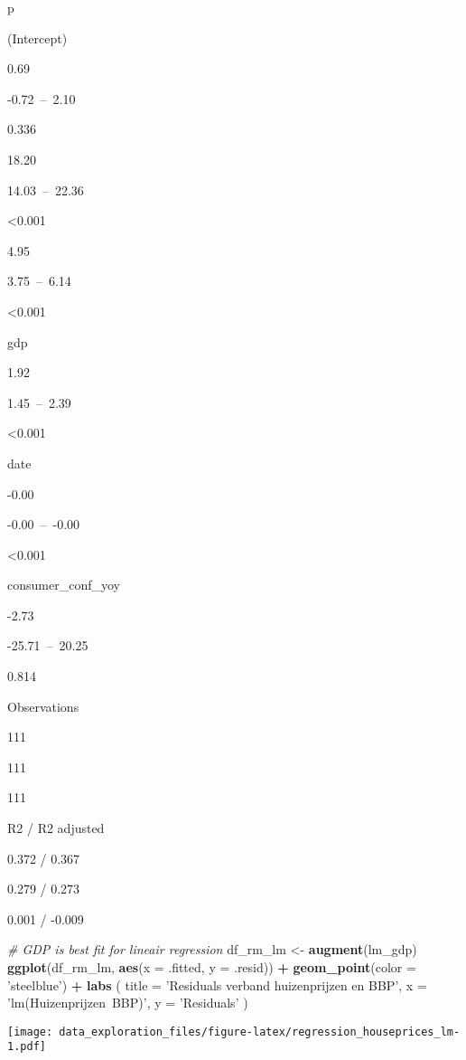 \documentclass[
]{article}
\newenvironment{Shaded}{\begin{snugshade}}{\end{snugshade}}
\newcommand{\CommentTok}[1]{\textcolor[rgb]{0.56,0.35,0.01}{\textit{#1}}}
\newcommand{\DataTypeTok}[1]{\textcolor[rgb]{0.13,0.29,0.53}{#1}}
\newcommand{\KeywordTok}[1]{\textcolor[rgb]{0.13,0.29,0.53}{\textbf{#1}}}
\newcommand{\NormalTok}[1]{#1}
\newcommand{\OperatorTok}[1]{\textcolor[rgb]{0.81,0.36,0.00}{\textbf{#1}}}
\newcommand{\StringTok}[1]{\textcolor[rgb]{0.31,0.60,0.02}{#1}}
\begin{document}
p

(Intercept)

0.69

-0.72~--~2.10

0.336

18.20

14.03~--~22.36

\textless0.001

4.95

3.75~--~6.14

\textless0.001

gdp

1.92

1.45~--~2.39

\textless0.001

date

-0.00

-0.00~--~-0.00

\textless0.001

consumer\_conf\_yoy

-2.73

-25.71~--~20.25

0.814

Observations

111

111

111

R2 / R2 adjusted

0.372 / 0.367

0.279 / 0.273

0.001 / -0.009

\begin{Shaded}
\begin{Highlighting}[]
\CommentTok{# GDP is best fit for lineair regression}
\NormalTok{df_rm_lm <-}\StringTok{ }\KeywordTok{augment}\NormalTok{(lm_gdp)}
\KeywordTok{ggplot}\NormalTok{(df_rm_lm, }\KeywordTok{aes}\NormalTok{(}\DataTypeTok{x =}\NormalTok{ .fitted, }\DataTypeTok{y =}\NormalTok{ .resid)) }\OperatorTok{+}\StringTok{ }
\StringTok{  }\KeywordTok{geom_point}\NormalTok{(}\DataTypeTok{color =} \StringTok{'steelblue'}\NormalTok{) }\OperatorTok{+}
\StringTok{  }\KeywordTok{labs}\NormalTok{ (}
      \DataTypeTok{title =} \StringTok{'Residuals verband huizenprijzen en BBP'}\NormalTok{,}
      \DataTypeTok{x =} \StringTok{'lm(Huizenprijzen~BBP)'}\NormalTok{,}
      \DataTypeTok{y =} \StringTok{'Residuals'}
\NormalTok{    )}
\end{Highlighting}
\end{Shaded}

\texttt{[image: data\_exploration\_files/figure-latex/regression\_houseprices\_lm-1.pdf]}
\end{document}

